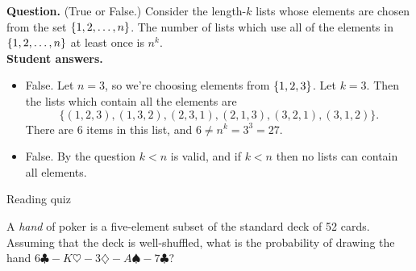 \documentclass[10pt]{beamer}
\begin{document}
\begin{frame}

\begin{mygreenbox}[title= Some nice creative thinking in answering Question \#2]
\footnotesize 
\textbf{Question.}  (True or False.) Consider the length-$k$ lists whose elements are chosen from the set $\{ {1,2,\hdots, n} \}$.  The number of lists which use all of the elements in $\{ {1,2,\hdots, n} \}$ at least once is $n^k$. \\

\textbf{Student answers.}
\begin{itemize}
\item False.  Let $n=3$, so we're choosing elements from $\{ {1,2,3} \}$.  Let $k=3$. Then the lists which contain all the elements are 
\[ \bigg\{ (1,2,3), (1,3,2), (2,3,1), (2,1,3), (3,2,1), (3,1,2) \bigg\}.\] 	
There are 6 items in this list, and $6 \neq n^k = 3^3= 27$.
\item False.  By the question $k<n$ is valid, and if $k<n$ then no lists can contain all elements.
\end{itemize}

\end{mygreenbox}


\end{frame}



\begin{frame}[standout]
Reading quiz
\end{frame}

\begin{frame}

\begin{mygreenbox}[title=\text{Reading Quiz}]
A \textit{hand} of poker is a five-element subset of the standard deck of 52 cards.   Assuming that the deck is well-shuffled, what is the probability of drawing the hand $6 \clubsuit -K \heartsuit - 3 \diamondsuit - A \spadesuit - 7 \clubsuit$?
\end{mygreenbox}
	
\end{frame}
\end{document}
